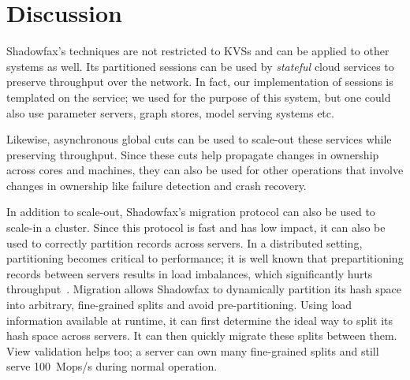 \section{Discussion}
\label{sec:discussion}

Shadowfax's techniques are not restricted to KVSs and can be applied to
other systems as well.
%
Its partitioned sessions can be used by \emph{stateful} cloud services
to preserve throughput over the network.
%
In fact, our implementation of sessions is templated on the service; we
used \faster for the purpose of this system, but one could also use
parameter servers, graph stores, model serving systems etc.

Likewise, asynchronous global cuts can be used to scale-out these
services while preserving throughput.
%
Since these cuts help propagate changes in ownership
across cores and machines, they can also be used for other operations
that involve changes in ownership like
failure detection and crash recovery.

In addition to scale-out, Shadowfax's migration protocol can also be
used to scale-in a cluster.
%
Since this protocol is fast and has low impact, it can also be used to
correctly partition records across servers.
%
In a distributed setting, partitioning becomes critical to
performance; it is well known that prepartitioning records between
servers results in load imbalances, which significantly hurts
throughput~\cite{dynamo,slicer}.
%
Migration allows Shadowfax to
dynamically partition its hash space into arbitrary, fine-grained splits
and
avoid pre-partitioning.
%
Using load information available at runtime, it can first determine the ideal
way to split its hash space across servers.
%
It can then quickly migrate these splits
between them.
%
View validation helps too; a server can own many fine-grained splits and still
serve 100~Mops/s during normal operation.
